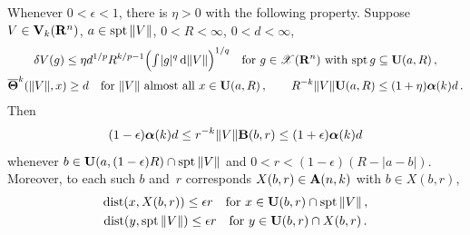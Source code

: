 \begin{theorem}
    \label{al:8.8}
    Whenever $0 < \epsilon < 1$, there is $\eta > 0$ with the following property. Suppose $V \in
    \mathbf{V}_{k}(\mathbf{R}^{n})$, $a \in \operatorname{spt} \|V\|$, $0 < R < \infty$, $0 < d < \infty$,
    \begin{gather*}
        \delta V(g) \le \eta d^{1/p} R^{k/p - 1} \Big( {\textstyle\int_{}^{}} |g|^q \,\mathrm{d} \|V\| \Big)^{1/q}
        \quad \text{for $g \in \mathscr{X}(\mathbf{R}^{n})$ with $\operatorname{spt} g \subseteq \mathbf{U}(a,R)$} \,, \\
        \boldsymbol{\overline{\Theta}}^{k}(\|V\|,x) \ge d \quad \text{for $\|V\|$ almost all $x \in \mathbf{U}(a,R)$} \,,
        \qquad R^{-k} \|V\| \mathbf{U}(a,R) \le (1 + \eta) \boldsymbol{\alpha}(k) d \,.
    \end{gather*}
    Then
    \begin{displaymath}
        (1 - \epsilon) \boldsymbol{\alpha}(k) d \le r^{-k} \|V\| \mathbf{B}(b,r) \le (1 + \epsilon)
        \boldsymbol{\alpha}(k) d
    \end{displaymath}
    whenever $b \in \mathbf{U}(a,(1-\epsilon) R) \cap \operatorname{spt} \|V\|$ and $0 < r < (1 - \epsilon)(R - |a
    - b|)$. Moreover, to each such $b$ and~$r$ corresponds $X(b,r) \in \mathbf{A}(n,k)$
    with $b \in X(b,r)$,
    \begin{gather*}
        \operatorname{dist}(x, X(b,r)) \le \epsilon r \quad \text{for $x \in \mathbf{U}(b,r) \cap \operatorname{spt} \|V\|$} \,,
        \\ \operatorname{dist}(y, \operatorname{spt} \|V\|) \le \epsilon r \quad \text{for $y \in \mathbf{U}(b,r) \cap X(b,r)$}
        \,.
    \end{gather*}
\end{theorem}

